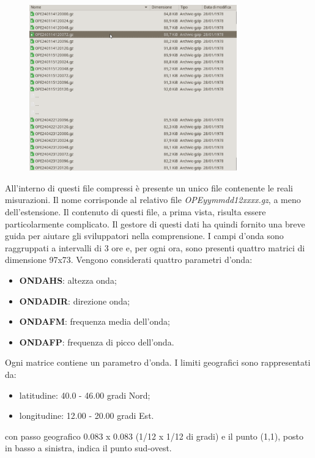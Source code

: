 \documentclass[./main.tex]{subfiles}
\begin{document}
\begin{figure}[!ht]
\noindent \begin{minipage}{\textwidth}
\vspace{1cm}
\centering
\includegraphics[width=0.8\textwidth]{images/thunar_OPE_henetus_compressed.pdf}
\captionsetup{font=small, hypcap=false}
\label{fig:thunar_OPE_henetus_compressed}
\end{minipage}
\vspace{0.25cm}
\end{figure}

All'interno di questi file compressi è presente un unico file contenente le reali misurazioni. Il nome corrisponde al relativo file \textit{OPEyymmdd12xxxx.gz}, a meno dell'estensione. Il contenuto di questi file, a prima vista, risulta essere particolarmente complicato. Il gestore di questi dati ha quindi fornito una breve guida per aiutare gli sviluppatori nella comprensione. I campi d'onda sono raggruppati a intervalli di 3 ore e, per ogni ora, sono presenti quattro matrici di dimensione 97x73. Vengono considerati quattro parametri d'onda:
\begin{itemize}
    \item \textbf{ONDAHS}: altezza onda;
    \item \textbf{ONDADIR}: direzione onda;
    \item \textbf{ONDAFM}: frequenza media dell'onda;
    \item \textbf{ONDAFP}: frequenza di picco dell'onda.
\end{itemize}
Ogni matrice contiene un parametro d'onda. I limiti geografici sono rappresentati da:
\begin{itemize}
    \item latitudine: 40.0 - 46.00  gradi Nord;
    \item longitudine:  12.00 - 20.00  gradi Est.
\end{itemize}
con passo geografico 0.083 x 0.083  (1/12 x 1/12 di gradi) e il punto (1,1), posto in basso a sinistra, indica il punto sud-ovest.
\end{document}
